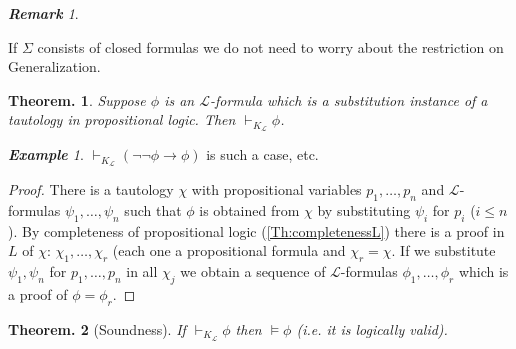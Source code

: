 \documentclass[a4paper,oneside,11pt,DIV=12,parskip=half]{scrartcl}
\newcommand{\LL}{\mathcal L}
\theoremstyle{plain}
\newtheorem{theorem}{Theorem.}[section]
\theoremstyle{definition}
\newtheorem{remark, definition}[theorem]{Remark and Definition.}
\newtheorem{lemma, definition}[theorem]{Lemma and Definition.}
\newtheorem{theorem, definition}[theorem]{Theorem and Definition.}
\theoremstyle{remark}
\newtheorem*{remark}{\textbf{Remark}}
\newtheorem*{example}{\textbf{Example}}
\newtheorem*{remark, example}{\textbf{Remark and Exercise}}
\begin{document}
\begin{remark}
\begin{enumerate}
    If $\Sigma$ consists of closed formulas we do not need to worry about the restriction on Generalization. 
\end{enumerate}
\end{remark}

\begin{theorem}
Suppose $\phi$ is an $\LL$-formula which is a substitution instance of a tautology in propositional logic. Then $\vdash_{K_\LL} \phi$.
\end{theorem}

\begin{example}
$\vdash_{K_\LL} (\lnot \lnot\phi \rightarrow \phi)$ is such a case, etc.
\end{example}

\begin{proof}
There is a tautology $\chi$ with propositional variables $p_1, \dots, p_n$ and $\LL$-formulas $\psi_1, \dots, \psi_n$ such that $\phi$ is obtained from $\chi$ by substituting $\psi_i$ for $p_i$ ($i \leq n$).
By completeness of propositional logic (\ref{Th:completenessL}) there is a proof in $L$ of $\chi$:
$\chi_1,\dots,\chi_r$ (each one a propositional formula and $\chi_r = \chi$.
If we substitute $\psi_1,\psi_n$ for $p_1,\dots, p_n$ in all $\chi_j$ we obtain a sequence of $\LL$-formulas $\phi_1,\dots,\phi_r$ which is a proof of $\phi = \phi_r$.
\end{proof}

\begin{theorem}[Soundness]\label{Th:soundness}
If $\vdash_{K_\LL} \phi$ then $\vDash \phi$ (i.e. it is logically valid).
\end{theorem}
\end{document}

